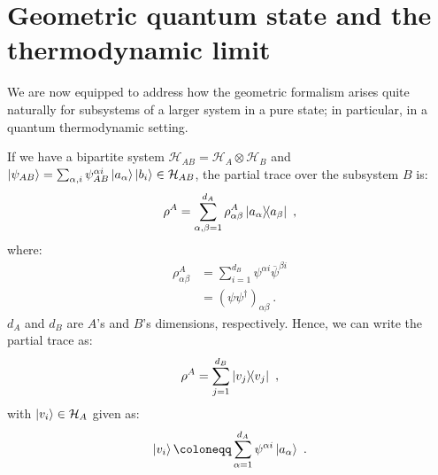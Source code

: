 \documentclass[draft,nofootinbib,pre,twocolumn,showpacs,showkeys,groupaddress,preprintnumbers,floatfix]{revtex4-1}
\newcommand{\1}{\mathbbm{1}}
\begin{document}
\section{Geometric quantum state and the thermodynamic limit}
\label{sec:Extension}

We are now equipped to address how the geometric formalism arises quite
naturally for subsystems of a larger system in a pure state; in particular, in
a quantum thermodynamic setting.

If we have a bipartite system $\mathcal{H}_{AB } = \mathcal{H}_A \otimes
\mathcal{H}_B$ and $\ket{\psi_{AB}} = \sum_{\alpha,i} \psi^{\alpha i}_{AB}
\ket{a_\alpha} \ket{b_i} \in \mathcal{H}_{AB}$, the partial trace over the
subsystem $B$ is:
\begin{align*}
\rho^A = \sum_{\alpha,\beta = 1}^{d_A}
  \rho^A_{\alpha\beta}  \ketbra{a_\alpha}{a_\beta}
  ~,
\end{align*}
where:
\begin{align*}
\rho_{\alpha\beta}^A
  & = \sum_{i=1}^{d_B} \psi^{\alpha i} \overline{\psi}^{\beta i} \\
  & =  (\psi \psi^\dagger)_{\alpha \beta}
  ~.
\end{align*}
$d_A$ and $d_B$ are $A$'s and $B$'s dimensions, respectively.
Hence, we can write the partial trace as:
\begin{align*}
\rho^A = \sum_{j=1}^{d_B} \ketbra{v_j}{v_j}
  ~,
\end{align*}
with $\ket{v_i} \in \mathcal{H}_A$ given as:
\begin{align*}
\ket{v_i} \coloneqq \sum_{\alpha=1}^{d_A} \psi^{\alpha i} \ket{a_\alpha}
  ~.
\end{align*}
\end{document}
